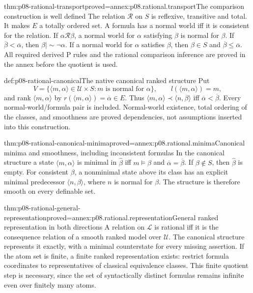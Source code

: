 \begin{hblemma}{thm:p08-rational-transport}{proved=annex:p08.rational.transport}{The comparison construction is well defined}
The relation \(\mathcal R\) on \(S\) is reflexive, transitive and
total. It makes \(E\) a totally ordered set. A formula has a normal
world iff it is consistent for the relation. If
\(\alpha\mathcal R\beta\), a normal world for \(\alpha\)
satisfying \(\beta\) is normal for \(\beta\).
If \(\overline\beta<\overline\alpha\), then
\(\beta\mathrel{|\!\sim}\neg\alpha\).
If a normal world for \(\alpha\) satisfies \(\beta\), then
\(\beta\in S\) and
\(\overline\beta\leq\overline\alpha\).
All required derived P rules and the rational comparison inference are
proved in the annex before the quotient is used.
\end{hblemma}

\begin{hbdefinition}{def:p08-rational-canonical}{The native canonical ranked structure}
Put
\[
 V=\{\langle m,\alpha\rangle\in\mathcal U\times S:
                         m\text{ is normal for }\alpha\},\qquad
 l(\langle m,\alpha\rangle)=m,
\]
and rank \(\langle m,\alpha\rangle\) by
\(r(\langle m,\alpha\rangle)=\overline\alpha\in E\).
Thus \(\langle m,\alpha\rangle\prec\langle n,\beta\rangle\)
iff \(\overline\alpha<\overline\beta\).
Every normal-world/formula pair is included. Normal-world existence,
total ordering of the classes, and smoothness are proved dependencies,
not assumptions inserted into this construction.
\end{hbdefinition}

\begin{hblemma}{thm:p08-rational-canonical-minima}{proved=annex:p08.rational.minima}{Canonical minima and smoothness, including inconsistent formulas}
In the canonical structure a state \(\langle m,\alpha\rangle\)
is minimal in \(\widehat\beta\) iff
\(m\models\beta\) and
\(\overline\alpha=\overline\beta\).
If \(\beta\notin S\), then \(\widehat\beta\) is empty.
For consistent \(\beta\), a nonminimal state above its class has an
explicit minimal predecessor \(\langle n,\beta\rangle\), where
\(n\) is normal for \(\beta\). The structure is therefore smooth
on every definable set.
\end{hblemma}

\begin{hbtheorem}{thm:p08-rational-general-representation}{proved=annex:p08.rational.representation}{General ranked representation in both directions}
A relation on \(\mathcal L\) is rational iff it is the consequence
relation of a smooth ranked model over \(\mathcal U\).
The canonical structure represents it exactly, with a minimal
counterstate for every missing assertion. If the atom set is finite,
a finite ranked representation exists: restrict formula coordinates
to representatives of classical equivalence classes. This finite
quotient step is necessary, since the set of syntactically distinct
formulas remains infinite even over finitely many atoms.
\end{hbtheorem}

